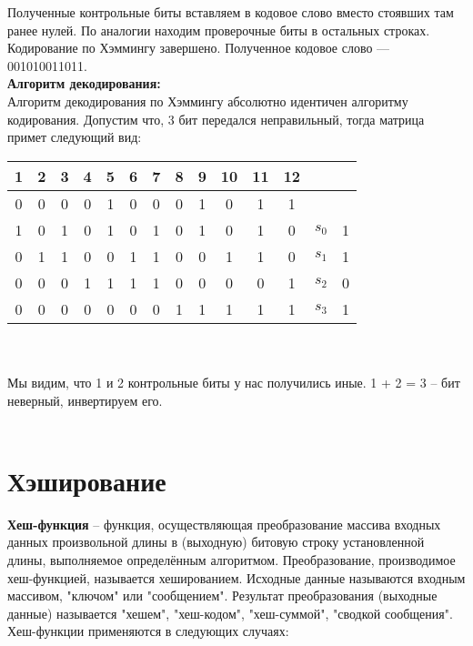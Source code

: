\documentclass[a4paper,12pt]{article}
\begin{document}
Полученные контрольные биты вставляем в кодовое слово вместо стоявших там ранее нулей. По аналогии находим проверочные биты в остальных строках. Кодирование по Хэммингу завершено. Полученное кодовое слово — 001010011011.\\

\textbf{Алгоритм декодирования:}\\
Алгоритм декодирования по Хэммингу абсолютно идентичен алгоритму кодирования. Допустим что, 3 бит передался неправильный, тогда матрица примет следующий вид:\\
\begin{table}[!h]
\begin{center}
\begin{tabular}{|c|c|c|c|c|c|c|c|c|c|c|c|c|c|}
\hline
1&2&3&4&5&6&7&8&9&10&11&12&&\\
\hline
\cellcolor{Red}0&\cellcolor{Red}0&0&\cellcolor{Red}0&1&0&0&\cellcolor{Red}0&1&0&1&1&&\\
\hline
1&0&1&0&1&0&1&0&1&0&1&0&$s_0$&1\\
\hline
0&1&1&0&0&1&1&0&0&1&1&0&$s_1$&1\\
\hline
0&0&0&1&1&1&1&0&0&0&0&1&$s_2$&0\\
\hline
0&0&0&0&0&0&0&1&1&1&1&1&$s_3$&1\\
\hline
\end{tabular}
\end{center}
\end{table}\\
\\
Мы видим, что 1 и 2 контрольные биты у нас получились иные. 1 + 2 = 3 -- бит неверный, инвертируем его.\\
\\
\section{Хэширование}

\textbf{Хеш-функция}  -- функция, осуществляющая преобразование массива входных данных произвольной длины в (выходную) битовую строку установленной длины, выполняемое определённым алгоритмом. Преобразование, производимое хеш-функцией, называется хешированием. Исходные данные называются входным массивом, "ключом" или "сообщением". Результат преобразования (выходные данные) называется "хешем", "хеш-кодом", "хеш-суммой", "сводкой сообщения".\\

Хеш-функции применяются в следующих случаях:\\
\end{document}
